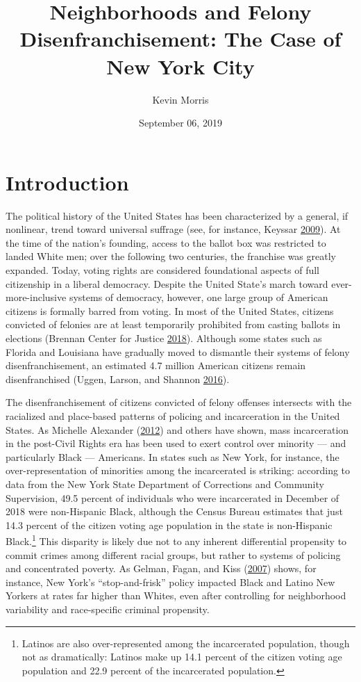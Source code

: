 \documentclass[]{article}
\title{Neighborhoods and Felony Disenfranchisement: The Case of New York City}
\author{Kevin Morris}
\date{September 06, 2019}
\let\rmarkdownfootnote\footnote%
\def\footnote{\protect\rmarkdownfootnote}
\begin{document}
\maketitle

\tableofcontents
\pagebreak


\hypertarget{introduction}{%
\section{Introduction}\label{introduction}}

The political history of the United States has been characterized by a general, if nonlinear, trend toward universal suffrage (see, for instance, Keyssar \protect\hyperlink{ref-Keyssar2009}{2009}). At the time of the nation's founding, access to the ballot box was restricted to landed White men; over the following two centuries, the franchise was greatly expanded. Today, voting rights are considered foundational aspects of full citizenship in a liberal democracy. Despite the United State's march toward ever-more-inclusive systems of democracy, however, one large group of American citizens is formally barred from voting. In most of the United States, citizens convicted of felonies are at least temporarily prohibited from casting ballots in elections (Brennan Center for Justice \protect\hyperlink{ref-bcj_laws}{2018}). Although some states such as Florida and Louisiana have gradually moved to dismantle their systems of felony disenfranchisement, an estimated 4.7 million American citizens remain disenfranchised (Uggen, Larson, and Shannon \protect\hyperlink{ref-sentencing_2016}{2016}).

The disenfranchisement of citizens convicted of felony offenses intersects with the racialized and place-based patterns of policing and incarceration in the United States. As Michelle Alexander (\protect\hyperlink{ref-Alexander2012}{2012}) and others have shown, mass incarceration in the post-Civil Rights era has been used to exert control over minority --- and particularly Black --- Americans. In states such as New York, for instance, the over-representation of minorities among the incarcerated is striking: according to data from the New York State Department of Corrections and Community Supervision, 49.5 percent of individuals who were incarcerated in December of 2018 were non-Hispanic Black, although the Census Bureau estimates that just 14.3 percent of the citizen voting age population in the state is non-Hispanic Black.\footnote{Latinos are also over-represented among the incarcerated population, though not as dramatically: Latinos make up 14.1 percent of the citizen voting age population and 22.9 percent of the incarcerated population.} This disparity is likely due not to any inherent differential propensity to commit crimes among different racial groups, but rather to systems of policing and concentrated poverty. As Gelman, Fagan, and Kiss (\protect\hyperlink{ref-Gelman2007}{2007}) shows, for instance, New York's ``stop-and-frisk'' policy impacted Black and Latino New Yorkers at rates far higher than Whites, even after controlling for neighborhood variability and race-specific criminal propensity.
\end{document}
